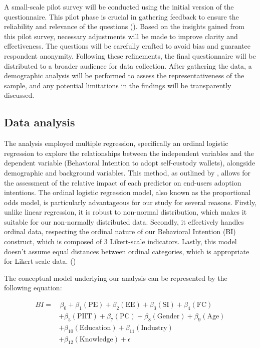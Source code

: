 \documentclass[twocolumn]{article}
\begin{document}
A small-scale pilot survey will be conducted using the initial version of the questionnaire. This pilot phase is crucial in gathering feedback to ensure the reliability and relevance of the questions (\cite{brace_questionnaire_2004}). Based on the insights gained from this pilot survey, necessary adjustments will be made to improve clarity and effectiveness. The questions will be carefully crafted to avoid bias and guarantee respondent anonymity. Following these refinements, the final questionnaire will be distributed to a broader audience for data collection. After gathering the data, a demographic analysis will be performed to assess the representativeness of the sample, and any potential limitations in the findings will be transparently discussed.

\subsection{Data analysis}

The analysis employed multiple regression, specifically an ordinal logistic regression to explore the relationships between the independent variables and the dependent variable (Behavioral Intention to adopt self-custody wallets), alongside demographic and background variables. This method, as outlined by \textcite{cohen_applied_2003}, allows for the assessment of the relative impact of each predictor on end-users adoption intentions.
The ordinal logistic regression model, also known as the proportional odds model, is particularly advantageous for our study for several reasons. Firstly, unlike linear regression, it is robust to non-normal distribution, which makes it suitable for our non-normally distributed data. Secondly, it effectively handles ordinal data, respecting the ordinal nature of our Behavioral Intention (BI) construct, which is composed of 3 Likert-scale indicators. Lastly, this model doesn't assume equal distances between ordinal categories, which is appropriate for Likert-scale data. (\cite{hair_multivariate_2019, cohen_applied_2003})

The conceptual model underlying our analysis can be represented by the following equation:

\begin{align}
BI = & \, \beta_0 + \beta_1(\text{PE}) + \beta_2(\text{EE}) + \beta_3(\text{SI}) + \beta_4(\text{FC}) \nonumber \\
     & + \beta_5(\text{PIIT}) + \beta_7(\text{PC}) + \beta_8(\text{Gender}) + \beta_9(\text{Age}) \nonumber \\
     & + \beta_{10}(\text{Education}) + \beta_{11}(\text{Industry}) \nonumber \\
     &  + \beta_{12}(\text{Knowledge})+ \epsilon
\end{align}
\end{document}
